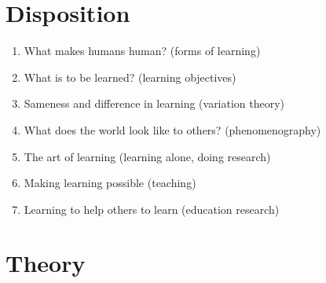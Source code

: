 \mode*

\begin{frame}
  \tableofcontents
\end{frame}

\section{Disposition}

\begin{frame}
  \begin{enumerate}
    \item What makes humans human?
      \hfill
      (forms of learning)
    \item What is to be learned?
      \hfill
      (learning objectives)
    \item Sameness and difference in learning
      \hfill
      (variation theory)
    \item What does the world look like to others?
      \hfill
      (phenomenography)
    \item The art of learning
      \hfill
      (learning alone, doing research)
    \item Making learning possible
      \hfill
      (teaching)
    \item Learning to help others to learn
      \hfill
      (education research)
  \end{enumerate}
\end{frame}


\section{Theory}

\begin{frame}
\end{frame}

